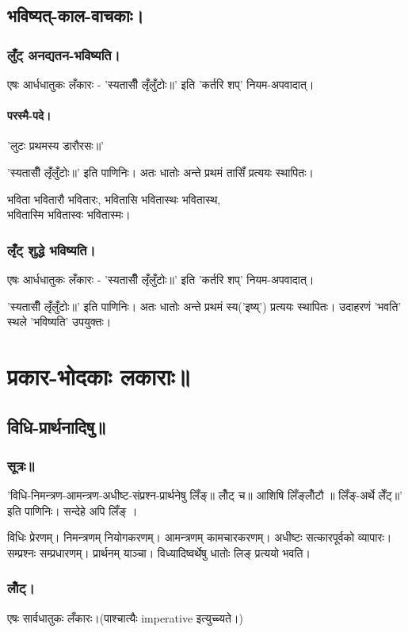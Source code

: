 \documentclass[oneside, article]{memoir}
\begin{document}
\section{भविष्यत्-काल-वाचकाः।}
\subsection{लुँट् अनद्यतन-भविष्यति।}
एषः आर्धधातुकः लँकारः - 'स्यतासीँ लृँलुँटोः॥' इति 'कर्तरि शप्‌' नियम-अपवादात्।

\subsubsection{परस्मै-पदे।}
'लुटः प्रथमस्य डारौरसः॥'

'स्यतासीँ लृँलुँटोः॥' इति पाणिनिः। अतः‌ धातोः अन्ते प्रथमं तासिँ प्रत्ययः स्थापितः। 

भविता भवितारौ भवितारः, भवितासि भवितास्थः भवितास्थ, \\
भवितास्मि भवितास्वः भवितास्मः।

\subsection{लृँट् शुद्धे भविष्यति।}
एषः आर्धधातुकः लँकारः - 'स्यतासीँ लृँलुँटोः॥' इति 'कर्तरि शप्‌' नियम-अपवादात्।

'स्यतासीँ लृँलुँटोः॥' इति पाणिनिः। अतः‌ धातोः अन्ते प्रथमं स्य('इष्य्') प्रत्ययः स्थापितः। उदाहरणं 'भवति' स्थले 'भविष्यति' उपयुक्तः।

\chapter{प्रकार-भोदकाः लकाराः॥}
\section{विधि-प्रार्थनादिषु॥}
\subsection{सूत्रः॥}
'विधि-निमन्त्रण-आमन्त्रण-अधीष्ट-संप्रश्न-प्रार्थनेषु लिँङ्॥ लोँट् च॥ आशिषि लिँङ्लोँटौ ॥ लिँङ्-अर्थे लेँट्॥'  इति पाणिनिः। सन्देहे अपि लिँङ् ।

विधिः प्रेरणम्। निमन्त्रणम् नियोगकरणम्। आमन्त्रणम् कामचारकरणम्। अधीष्टः सत्कारपूर्वको व्यापारः। सम्प्रश्नः सम्प्रधारणम्। प्रार्थनम् याञ्चा। विध्यादिष्वर्थेषु धातोः लिङ् प्रत्ययो भवति।


\subsection{लोँट्।}
एषः सार्वधातुकः लँकारः।(पाश्चात्यैः imperative इत्युच्च्यते।)
\end{document}
